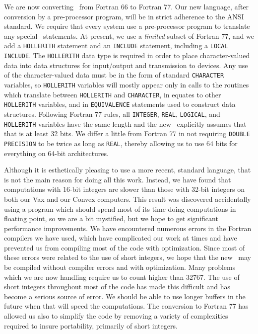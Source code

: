      We are now converting \AIPS\ from Fortran 66 to Fortran 77.  Our
new language, after conversion by a pre-processor program, will be in
strict adherence to the ANSI standard.  We require that every system
use a pre-processor program to translate any special \AIPS\ statements.
At present, we use a {\it limited} subset of Fortran 77, and we add a
{\tt HOLLERITH} statement and an {\tt INCLUDE} statement, including a
{\tt LOCAL} \hbox{{\tt INCLUDE}}.  The {\tt HOLLERITH} data type is
required in order to
place character-valued data into data structures for input/output and
transmission to devices.  Any use of the character-valued data must
be in the form of standard {\tt CHARACTER} variables, so {\tt HOLLERITH}
variables will mostly appear only in calls to the routines which
translate between {\tt HOLLERITH} and {\tt CHARACTER}, in equates
to other {\tt HOLLERITH} variables, and in {\tt EQUIVALENCE} statements
used to construct data structures.  Following Fortran 77 rules, all
{\tt INTEGER}, {\tt REAL}, {\tt LOGICAL}, and {\tt HOLLERITH} variables
have the same length and the new \AIPS\ explicitly assumes that that is
at least 32 bits.  We differ a little from Fortran 77 in not requiring
{\tt DOUBLE} {\tt PRECISION} to be twice as long as {\tt REAL}, thereby
allowing us to use 64 bits for everything on 64-bit architectures.

     Although it is esthetically pleasing to use a more recent,
standard language, that is not the main reason for doing all this work.
 Instead, we have found that computations with 16-bit integers are
slower than those with 32-bit integers on both our Vax and our Convex
computers.  This result was discovered accidentally using a program which
should spend most of its time doing computations in floating point, so
we are a bit mystified, but we hope to get significant performance
improvements.  We have encountered numerous errors in the Fortran
compilers we have used, which have complicated our work at times and
have prevented us from compiling most of the code with optimization.
Since most of these errors were related to the use of short integers,
we hope that the new \AIPS\ may be compiled without compiler errors
and with optimization.  Many problems which we are now handling
require us to count higher than 32767.  The use of short integers
throughout most of the code has made this difficult and has become a serious
source of error.  We should be able to use longer buffers in the
future when that will speed the computations.  The conversion to
Fortran 77 has allowed us also to simplify the code by removing a
variety of complexities required to insure portability, primarily
of short integers.

